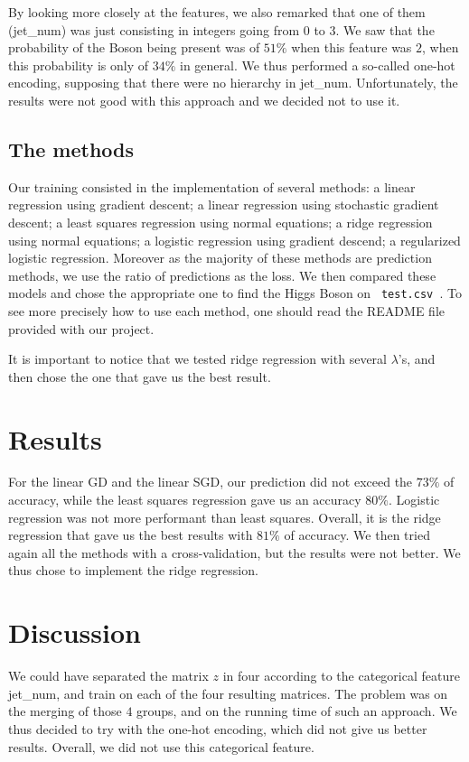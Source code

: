 \documentclass[10pt, oneside]{article}   	%
\begin{document}
By looking more closely at the features, we also remarked that one of them (jet\_num) was just consisting in integers going from $0$ to $3$. We saw that the probability of the Boson being present was of $51\%$ when this feature was $2$, when this probability is only of $34\%$ in general. We thus performed a so-called one-hot encoding, supposing that there were no hierarchy in jet\_num. Unfortunately, the results were not good with this approach and we  decided not to use it.

\subsection{The methods}

Our training consisted in the implementation of several methods: a linear regression using gradient descent; a linear regression using stochastic gradient descent; a least squares regression using normal equations; a ridge regression using normal equations; a logistic regression using gradient descend; a regularized logistic regression. Moreover as the majority of these methods are prediction methods, we use the ratio of predictions as the loss.
We then compared these models and chose the appropriate one to find the Higgs Boson on \lstinline! test.csv !. To see more precisely how to use each method, one should read the README file provided with our project.

It is important to notice that we tested ridge regression with several $\lambda$'s, and then chose the one that gave us the best result. 

\section{Results}
For the linear GD and the linear SGD, our prediction did not exceed the $73\%$ of accuracy, while the least squares regression gave us an accuracy $80\%$. Logistic regression was not more performant than least squares. Overall, it is the ridge regression that gave us the best results with $81\%$ of accuracy.
We then tried again all the methods with a cross-validation, but the results were not better. We thus chose to implement the ridge regression.

\section{Discussion}
We could have separated the matrix $z$ in four according to the categorical feature jet\_num, and train on each of the four resulting matrices. The problem was on the merging of those $4$ groups, and on the running time of such an approach. We thus decided to try with the one-hot encoding, which did not give us better results. Overall, we did not use this categorical feature.
\end{document}
